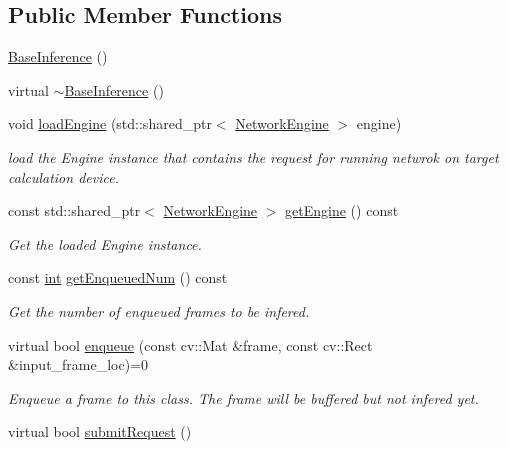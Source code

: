 \subsection*{Public Member Functions}
\begin{DoxyCompactItemize}
\item 
\hyperlink{classopenvino__service_1_1BaseInference_ac44efffac6ad744cac77866a1b4e6044}{Base\+Inference} ()
\item 
virtual \hyperlink{classopenvino__service_1_1BaseInference_a6d93394f51aacb7657359f7d7995b351}{$\sim$\+Base\+Inference} ()
\item 
void \hyperlink{classopenvino__service_1_1BaseInference_a90c8aa5a53236276fe06df8116bcf724}{load\+Engine} (std\+::shared\+\_\+ptr$<$ \hyperlink{classNetworkEngine}{Network\+Engine} $>$ engine)
\begin{DoxyCompactList}\small\item\em load the Engine instance that contains the request for running netwrok on target calculation device. \end{DoxyCompactList}\item 
const std\+::shared\+\_\+ptr$<$ \hyperlink{classNetworkEngine}{Network\+Engine} $>$ \hyperlink{classopenvino__service_1_1BaseInference_a27ef6d92c87dec4480f818a2bcca62a4}{get\+Engine} () const 
\begin{DoxyCompactList}\small\item\em Get the loaded Engine instance. \end{DoxyCompactList}\item 
const \hyperlink{CMakeCache_8txt_a79a3d8790b2588b09777910863574e09}{int} \hyperlink{classopenvino__service_1_1BaseInference_a130e3cbdc5760a4a42ad5af401398d37}{get\+Enqueued\+Num} () const 
\begin{DoxyCompactList}\small\item\em Get the number of enqueued frames to be infered. \end{DoxyCompactList}\item 
virtual bool \hyperlink{classopenvino__service_1_1BaseInference_a907695e3f04fd9ca079cc5a8bab948b1}{enqueue} (const cv\+::\+Mat \&frame, const cv\+::\+Rect \&input\+\_\+frame\+\_\+loc)=0
\begin{DoxyCompactList}\small\item\em Enqueue a frame to this class. The frame will be buffered but not infered yet. \end{DoxyCompactList}\item 
virtual bool \hyperlink{classopenvino__service_1_1BaseInference_a33b93ef057b95bf7968583e4c2eba0c9}{submit\+Request} ()

\end{DoxyCompactItemize}
